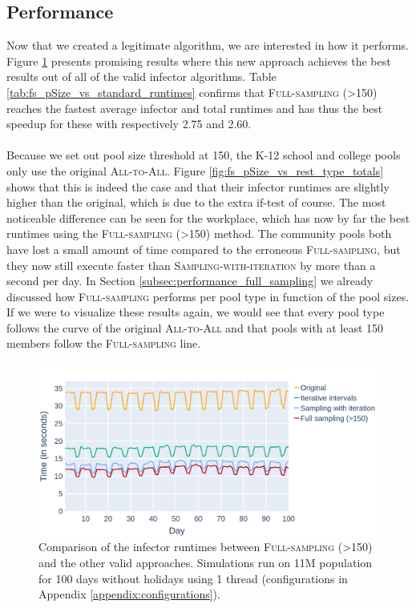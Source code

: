 \subsection{Performance}
\label{subsec:performance_adjusted_full_sampling}
Now that we created a legitimate algorithm, we are interested in how it performs. Figure \ref{fig:fs_pSize_vs_rest_infector} presents promising results where this new approach achieves the best results out of all of the valid infector algorithms. Table \ref{tab:fs_pSize_vs_standard_runtimes} confirms that \textsc{Full-sampling (>150)} reaches the fastest average infector and total runtimes and has thus the best speedup for these with respectively 2.75 and 2.60.
\\\\
Because we set out pool size threshold at 150, the K-12 school and college pools only use the original \textsc{All-to-All}. Figure \ref{fig:fs_pSize_vs_rest_type_totals} shows that this is indeed the case and that their infector runtimes are slightly higher than the original, which is due to the extra if-test of course. The most noticeable difference can be seen for the workplace, which has now by far the best runtimes using the \textsc{Full-sampling (>150)} method. The community pools both have lost a small amount of time compared to the erroneous \textsc{Full-sampling}, but they now still execute faster than \textsc{Sampling-with-iteration} by more than a second per day. In Section \ref{subsec:performance_full_sampling} we already discussed how \textsc{Full-sampling} performs per pool type in function of the pool sizes. If we were to visualize these results again, we would see that every pool type follows the curve of the original \textsc{All-to-All} and that pools with at least 150 members follow the \textsc{Full-sampling} line.

\begin{figure}
    \centering
    \includegraphics[width=\textwidth]{4 - Sampling/fig/adjusted_full_sampling/fs_pSize_vs_rest_infector.png}
    \caption{Comparison of the infector runtimes between \textsc{Full-sampling (>150)} and the other valid approaches. Simulations run on 11M population for 100 days without holidays using 1 thread (configurations in Appendix \ref{appendix:configurations}).}
    \label{fig:fs_pSize_vs_rest_infector}
\end{figure}

